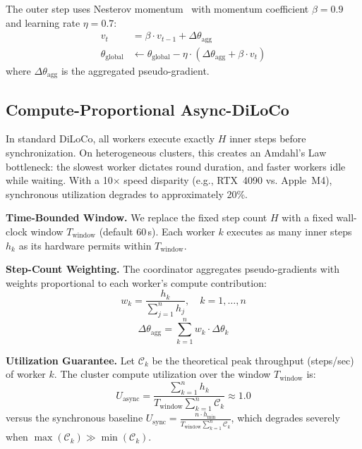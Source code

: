 \documentclass[10pt,conference]{IEEEtran}
\begin{document}
The outer step uses Nesterov momentum~\cite{nesterov1983} with momentum
coefficient $\beta = 0.9$ and learning rate $\eta = 0.7$:
\begin{align}
  v_t &= \beta \cdot v_{t-1} + \Delta\theta_{\text{agg}} \label{eq:momentum}\\
  \theta_{\text{global}} &\leftarrow \theta_{\text{global}}
    - \eta \cdot (\Delta\theta_{\text{agg}} + \beta \cdot v_t)
  \label{eq:nesterov}
\end{align}
where $\Delta\theta_{\text{agg}}$ is the aggregated pseudo-gradient.

\subsection{Compute-Proportional Async-DiLoCo}
\label{sec:compute-proportional}

In standard DiLoCo, all workers execute exactly $H$ inner steps before
synchronization. On heterogeneous clusters, this creates an Amdahl's Law
bottleneck: the slowest worker dictates round duration, and faster workers
idle while waiting. With a 10$\times$ speed disparity (e.g., RTX~4090 vs.
Apple~M4), synchronous utilization degrades to approximately 20\%.

\textbf{Time-Bounded Window.} We replace the fixed step count $H$ with a
fixed wall-clock window $T_{\text{window}}$ (default 60\,s). Each worker $k$
executes as many inner steps $h_k$ as its hardware permits within
$T_{\text{window}}$.

\textbf{Step-Count Weighting.} The coordinator aggregates pseudo-gradients
with weights proportional to each worker's compute contribution:
\begin{equation}
  w_k = \frac{h_k}{\displaystyle\sum_{j=1}^{n} h_j},
  \quad k = 1, \ldots, n
  \label{eq:weights}
\end{equation}
\begin{equation}
  \Delta\theta_{\text{agg}} = \sum_{k=1}^{n} w_k \cdot \Delta\theta_k
  \label{eq:weighted-agg}
\end{equation}

\textbf{Utilization Guarantee.} Let $\mathcal{C}_k$ be the theoretical peak
throughput (steps/sec) of worker $k$. The cluster compute utilization over
the window $T_{\text{window}}$ is:
\begin{equation}
  U_{\text{async}} = \frac{\sum_{k=1}^{n} h_k}
  {T_{\text{window}} \sum_{k=1}^{n} \mathcal{C}_k} \approx 1.0
  \label{eq:utilization}
\end{equation}
versus the synchronous baseline
$U_{\text{sync}} = \frac{n \cdot h_{\min}}
{T_{\text{window}} \sum_{k=1}^{n} \mathcal{C}_k}$,
which degrades severely when
$\max(\mathcal{C}_k) \gg \min(\mathcal{C}_k)$.
\end{document}

